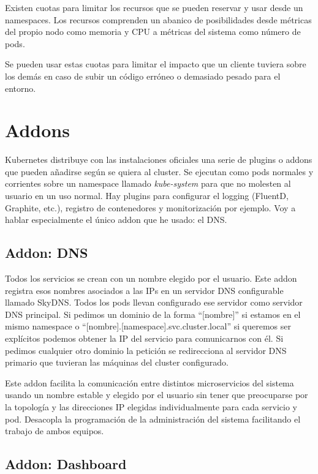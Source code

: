 Existen cuotas para limitar los recursos que se pueden reservar y usar desde un namespaces. Los recursos comprenden un abanico de posibilidades desde métricas del propio nodo como memoria y CPU a métricas del sistema como número de pods\cite{k8squota}.

Se pueden usar estas cuotas para limitar el impacto que un cliente tuviera sobre los demás en caso de subir un código erróneo o demasiado pesado para el entorno.

\section{Addons}
\label{sec:addons}

Kubernetes distribuye con las instalaciones oficiales una serie de plugins o addons que pueden añadirse según se quiera al cluster. Se ejecutan como pods normales y corrientes sobre un namespace llamado \emph{kube-system} para que no molesten al usuario en un uso normal. Hay plugins para configurar el logging (FluentD, Graphite, etc.), registro de contenedores y monitorización por ejemplo. Voy a hablar especialmente el único addon que he usado: el DNS.

\subsection{Addon: DNS}
\label{subsec:addons-dns}

Todos los servicios se crean con un nombre elegido por el usuario. Este addon registra esos nombres asociados a las IPs en un servidor DNS configurable llamado SkyDNS\cite{skydns}. Todos los pods llevan configurado ese servidor como servidor DNS principal. Si pedimos un dominio de la forma ``[nombre]'' si estamos en el mismo namespace o ``[nombre].[namespace].svc.cluster.local'' si queremos ser explícitos podemos obtener la IP del servicio para comunicarnos con él. Si pedimos cualquier otro dominio la petición se redirecciona al servidor DNS primario que tuvieran las máquinas del cluster configurado.

Este addon facilita la comunicación entre distintos microservicios del sistema usando un nombre estable y elegido por el usuario sin tener que preocuparse por la topología y las direcciones IP elegidas individualmente para cada servicio y pod. Desacopla la programación de la administración del sistema facilitando el trabajo de ambos equipos.

\subsection{Addon: Dashboard}
\label{subsec:addon-dashboard}

